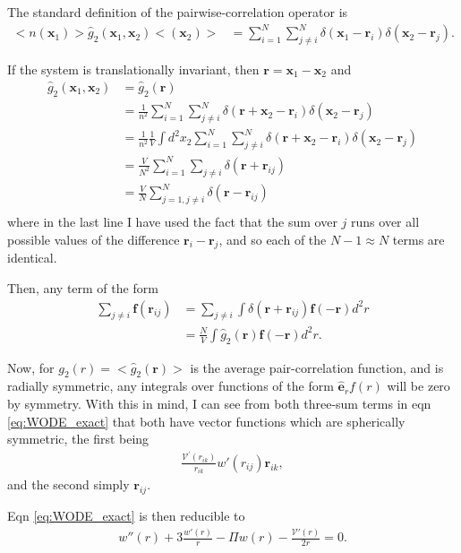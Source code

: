 \documentclass[twocolumn,amsmath,amssymb,aps]{revtex4-1}%
\begin{document}
The standard definition of the pairwise-correlation operator is
\begin{align}
  <n(\bm{x}_1)>\hat{g}_2(\bm{x}_1,\bm{x}_2)<(\bm{x}_2)>
  &=\sum_{i=1}^N\sum_{j\neq i}^N\delta(\bm{x}_1-\bm{r}_i)
    \delta(\bm{x}_2-\bm{r}_j).
\end{align}

If the system is translationally invariant, then $\bm{r}=\bm{x}_1-\bm{x}_2$
and
\begin{align}
  \hat{g}_2(\bm{x}_1,\bm{x}_2)
  &=\hat{g}_2(\bm{r})\nonumber\\
  &=\frac{1}{n^2}\sum_{i=1}^N\sum_{j\neq i}^N\delta(\bm{r}+\bm{x}_2-\bm{r}_i)
  \delta(\bm{x}_2-\bm{r}_j)\nonumber\\
  &=\frac{1}{n^2}\frac{1}{V}\int d^2x_2 \sum_{i=1}^N\sum_{j\neq i}^N
  \delta(\bm{r}+\bm{x}_2-\bm{r}_i)\delta(\bm{x}_2-\bm{r}_j)\nonumber\\
  &=\frac{V}{N^2}\sum_{i=1}^N\sum_{j\neq i}
  \delta(\bm{r}+\bm{r}_{ij})\nonumber\\
  &=\frac{V}{N}\sum_{j=1,j\neq i}^N\delta(\bm{r}-\bm{r}_{ij})\nonumber\\
\end{align}
where in the last line I have used the fact that the sum over $j$ runs over
all possible values of the difference $\bm{r}_i-\bm{r}_j$, and so each of the
$N-1\approx N$ terms are identical.

Then, any term of the form
\begin{align}
  \sum_{j\neq i} \bm{f}(\bm{r}_{ij})
  &= \sum_{j\neq i}\int \delta(\bm{r}+\bm{r}_{ij})\bm{f}(-\bm{r})
  d^2r\nonumber\\
  &=\frac{N}{V}\int\hat{g}_2(\bm{r})\bm{f}(-\bm{r})d^2r.
\end{align}

Now, for $g_2(r)=<\hat{g}_2(\bm{r})>$ is the average pair-correlation function,
and is radially symmetric, any integrals over functions of the form
$\bm{\hat{e}}_r f(r)$ will be zero by symmetry. With this in mind, I can see
from both three-sum terms in eqn \ref{eq:WODE_exact} that both have vector
functions which are spherically symmetric, the first being 
\begin{align}
  \frac{\mathcal{V}^{\prime}(r_{ik})}{r_{ik}}w'(r_{ij})\bm{r}_{ik},
\end{align}
and the second simply $\bm{r}_{ij}$. 

Eqn \ref{eq:WODE_exact} is then reducible to
\begin{align}\label{eq:WODE_isotropic}
  w''(r)+3\frac{w'(r)}{r}-\Pi w(r)-\frac{\mathcal{V}'(r)}{2r}=0.
\end{align}
\end{document}
